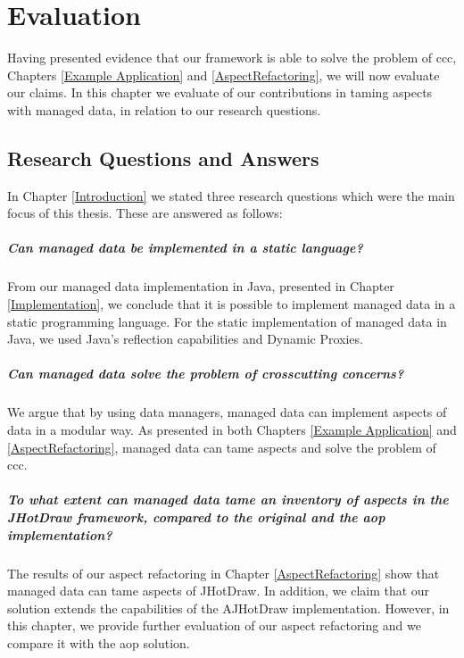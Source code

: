 
\chapter{Evaluation}\label{Evaluation}

Having presented evidence that our framework is able to solve the problem of \ac{ccc}, Chapters \ref{Example Application} and \ref{AspectRefactoring}, we will now evaluate our claims.
In this chapter we evaluate of our contributions in taming aspects with managed data, in relation to our research questions.

\section{Research Questions and Answers}\label{Research Questions and Answers}
In Chapter \ref{Introduction} we stated three research questions which were the main focus of this thesis.
These are answered as follows:

\paragraph{Can managed data be implemented in a static language?}
From our managed data implementation in Java, presented in Chapter \ref{Implementation}, we conclude that it is possible to implement managed data in a static programming language.
For the static implementation of managed data in Java, we used Java's reflection capabilities and Dynamic Proxies.

\paragraph{Can managed data solve the problem of crosscutting concerns?}
We argue that by using data managers, managed data can implement aspects of data in a modular way.
As presented in both Chapters \ref{Example Application} and \ref{AspectRefactoring}, managed data can tame aspects and solve the problem of \acrlong{ccc}.

\paragraph{To what extent can managed data tame an inventory of aspects in the JHotDraw framework, compared to the original and the \acrlong{aop} implementation?}
The results of our aspect refactoring in Chapter \ref{AspectRefactoring} show that managed data can tame aspects of JHotDraw. 
In addition, we claim that our solution extends the capabilities of the AJHotDraw implementation.
However, in this chapter, we provide further evaluation of our aspect refactoring and we compare it with the \acrlong{aop} solution.

